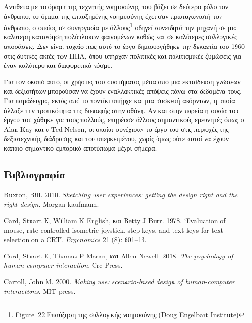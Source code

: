 \documentclass[
]{article}
\newlength{\cslhangindent}
\newlength{\cslentryspacingunit} %
\newenvironment{CSLReferences}[2] %
 {%
  \setlength{\parindent}{0pt}
  \ifodd #1
  \let\oldpar\par
  \def\par{\hangindent=\cslhangindent\oldpar}
  \fi
  \setlength{\parskip}{#2\cslentryspacingunit}
 }%
 {}
\begin{document}
Αντίθετα με το όραμα της τεχνητής νοημοσύνης που βάζει σε δεύτερο ρόλο
τον άνθρωπο, το όραμα της επαυξημένης νοημοσύνης έχει σαν πρωταγωνιστή
τον άνθρωπο, ο οποίος σε συνεργασία με άλλους\footnote{Figure~\protect\hyperlink{fig:nls-group}{22}
  Επαύξηση της συλλογικής νοημοσύνης (Doug Engelbart Institute)} οδηγεί
συνειδητά την μηχανή σε μια καλύτερη κατανόηση πολύπλοκων φαινομένων
καθώς και σε καλύτερες συλλογικές αποφάσεις. Δεν είναι τυχαίο πως αυτό
το έργο δημιουργήθηκε την δεκαετία του 1960 στις δυτικές ακτές των ΗΠΑ,
όπου υπήρχαν πολιτικές και πολιτισμικές ζυμώσεις για έναν καλύτερο και
διαφορετικό κόσμο.

Για τον σκοπό αυτό, οι χρήστες του συστήματος μέσα από μια εκπαίδευση
γνώσεων και δεξιοτήτων μπορούσαν να έχουν εναλλακτικές απόψεις πάνω στα
δεδομένα τους. Για παράδειγμα, εκτός από το ποντίκι υπήρχε και μια
συσκευή ακόρντων, η οποία άλλαζε την τροπικότητα της διεπαφής στην
οθόνη. Αν και στην πορεία η ουσία του έργου του χάθηκε για τους πολλούς,
επηρέασε άλλους σημαντικούς ερευνητές όπως ο Alan Kay και ο Ted Nelson,
οι οποίοι συνέχισαν το έργο του στις περιοχές της δεξιοτεχνικής
διάδρασης και του υπερκειμένου, χωρίς όμως ούτε αυτοί να έχουν κάποιο
σημαντικό εμπορικό αποτύπωμα μέχρι σήμερα.

\hypertarget{ux3b2ux3b9ux3b2ux3bbux3b9ux3bfux3b3ux3c1ux3b1ux3c6ux3afux3b1}{%
\subsection*{Βιβλιογραφία}\label{ux3b2ux3b9ux3b2ux3bbux3b9ux3bfux3b3ux3c1ux3b1ux3c6ux3afux3b1}}

\hypertarget{refs}{}
\begin{CSLReferences}{0}{0}
\end{CSLReferences}

Buxton, Bill. 2010. \emph{Sketching user experiences: getting the design
right and the right design}. Morgan kaufmann.

Card, Stuart K, William K English, και Betty J Burr. 1978. {`Evaluation
of mouse, rate-controlled isometric joystick, step keys, and text keys
for text selection on a CRT'}. \emph{Ergonomics} 21 (8): 601--13.

Card, Stuart K, Thomas P Moran, και Allen Newell. 2018. \emph{The
psychology of human-computer interaction}. Crc Press.

Carroll, John M. 2000. \emph{Making use: scenario-based design of
human-computer interactions}. MIT press.
\end{document}
